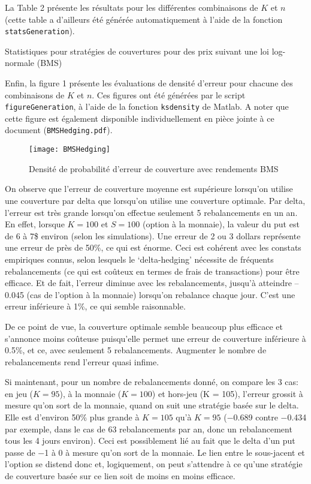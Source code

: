 \documentclass[12pt,fleqn]{article}
\begin{document}
La Table 2 présente les résultats pour les différentes combinaisons de $K$ et $n$ (cette
table a d'ailleurs été générée automatiquement à l'aide de la fonction
\verb+statsGeneration+). 
\begin{table}
\footnotesize{}
\caption{Statistiques pour stratégies de couvertures pour des prix suivant une loi
  log-normale (BMS)}
\end{table}

Enfin, la figure 1 présente les évaluations de densité d'erreur pour chacune des
combinaisons de $K$ et $n$. Ces figures ont été générées par le script
\verb+figureGeneration+, à l'aide de la fonction \verb+ksdensity+ de Matlab. A noter que
cette figure est également disponible individuellement en pièce jointe à ce document
(\verb+BMSHedging.pdf+). 
\begin{figure}
  \centering
  \texttt{[image: BMSHedging]}
  \caption{Densité de probabilité d'erreur de couverture avec rendements BMS}
  \label{fig:1}
\end{figure}

On observe que l’erreur de couverture moyenne est supérieure lorsqu’on utilise une
couverture par delta que lorsqu’on utilise une couverture optimale. Par delta, l’erreur
est très grande lorsqu’on effectue seulement 5 rebalancements en un an. En effet, lorsque
$K=100$ et $S = 100$ (option à la monnaie), la valeur du put est de 6 à 7\$ environ (selon
les simulations). Une erreur de 2 ou 3 dollars représente une erreur de près de 50\%, ce
qui est énorme. Ceci est cohérent avec les constats empiriques connus, selon lesquels le
`delta-hedging' nécessite de fréquents rebalancements (ce qui est coûteux en termes de
frais de transactions) pour être efficace. Et de fait, l’erreur diminue avec les
rebalancements, jusqu’à atteindre – 0.045 (cas de l’option à la monnaie) lorsqu’on
rebalance chaque jour. C’est une erreur inférieure à 1\%, ce qui semble raisonnable.

De ce point de vue, la couverture optimale semble beaucoup plus efficace et s’annonce
moins coûteuse puisqu’elle permet une erreur de couverture inférieure à 0.5\%, et ce, avec
seulement 5 rebalancements. Augmenter le nombre de rebalancements rend l’erreur quasi
infime.

Si maintenant, pour un nombre de rebalancements donné, on compare les 3 cas: en jeu
($K= 95$), à la monnaie ($K = 100$) et hors-jeu (K = 105), l’erreur grossit à mesure qu’on
sort de la monnaie, quand on suit une stratégie basée sur le delta. Elle est d’environ
50\% plus grande à $K = 105$ qu’à $K = 95$ (\num{-0.689} contre \num{-0.434} par exemple,
dans le cas de 63 rebalancements par an, donc un rebalancement tous les 4 jours
environ). Ceci est possiblement lié au fait que le delta d’un put passe de \num{-1} à 0 à
mesure qu’on sort de la monnaie. Le lien entre le sous-jacent et l’option se distend donc
et, logiquement, on peut s’attendre à ce qu’une stratégie de couverture basée sur ce lien
soit de moins en moins efficace.
\end{document}
